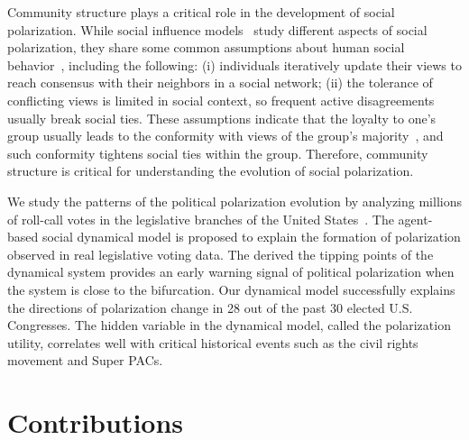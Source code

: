Community structure plays a critical role in the development of social polarization. While social influence models~\cite{jin2014misinformation,allcott2017social,garrett2009echo,stroud2010polarization,mcpherson2001birds} study different aspects of social polarization, they share some common assumptions about human social behavior~\cite{dixit2007political}, including the following: (i) individuals iteratively update their views to reach consensus with their neighbors in a social network; (ii) the tolerance of conflicting 
views is limited in social context, so frequent active disagreements usually break social ties. These assumptions indicate that the loyalty to one's group usually leads to the conformity with views of the group's majority~\cite{deutsch1955study}, and such conformity tightens social ties within the group. Therefore, community structure is critical for understanding the evolution of social polarization.

We study the patterns of the political polarization evolution by analyzing millions of roll-call votes in the legislative branches of the United States~\cite{lu2018evolution}. The agent-based social dynamical model is proposed to explain the formation of polarization observed in real legislative voting data. The derived the tipping points of the dynamical system provides an early warning signal of political polarization when the system is close to the bifurcation. Our dynamical model successfully explains the directions of polarization change in 28 out of the past 30 elected U.S. Congresses. The hidden variable in the dynamical model, called the polarization utility, correlates well with critical historical events such as the civil rights movement and Super PACs.






\section{Contributions}

